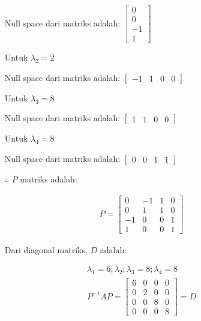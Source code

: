 \documentclass[12pt, a4paper]{scrartcl}
\begin{document}
\begin{enumerate}
\begin{enumerate}
                \begin{itemize}
                    \item[] Null space dari matriks adalah: $\begin{bmatrix}
                        0\\0\\-1\\1
                    \end{bmatrix}$
                    \item[] Untuk $\lambda_2 = 2$
                    \item[] Null space dari matriks adalah: $\begin{bmatrix}
                        -1&1&0&0
                    \end{bmatrix}$
                    \item[] Untuk $\lambda_3 = 8$
                    \item[] Null space dari matriks adalah: $\begin{bmatrix}
                        1&1&0&0
                    \end{bmatrix}$
                    \item[] Untuk $\lambda_4 = 8$
                    \item[] Null space dari matriks adalah: $\begin{bmatrix}
                        0&0&1&1
                    \end{bmatrix}$
                    \item[$\therefore$] $P$ matriks adalah: 
                \end{itemize}
                \begin{align*}
                    P = \begin{bmatrix}
                        0&-1&1&0
                        \\ 0&1&1&0
                        \\ -1&0&0&1
                        \\ 1&0&0&1
                    \end{bmatrix}
                \end{align*}
                \begin{itemize}
                    \item[] Dari diagonal matriks, $D$ adalah:
                \end{itemize}
                \begin{align*}
                    \lambda_1 = 6; \lambda_2; \lambda_3 = 8; \lambda_4 = 8
                    \\ P^{-1}AP=\begin{bmatrix}
                        6&0&0&0\\0&2&0&0\\0&0&8&0\\0&0&0&8
                    \end{bmatrix} = D
                \end{align*}


\end{enumerate}
\end{enumerate}
\end{document}
